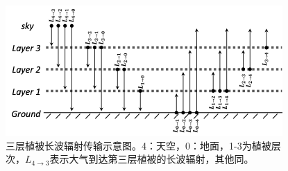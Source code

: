 {
\begin{figure}[]
\centering
\includegraphics{Figures/辐射过程及辐射通量计算/三层植被长波辐射传输示意图.png}
\caption{三层植被长波辐射传输示意图。4：天空，0：地面，1-3为植被层次，$L_{4 \rightarrow 3}$表示大气到达第三层植被的长波辐射，其他同。}
\label{fig:三层植被长波辐射传输示意图}
\end{figure}
}



